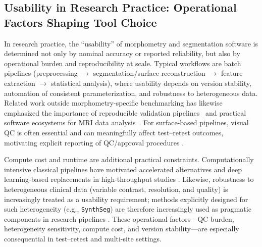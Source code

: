 \documentclass{midl} %
\begin{document}
\subsection{Usability in Research Practice: Operational Factors Shaping Tool Choice}
In research practice, the ``usability'' of morphometry and segmentation software is determined not only by nominal accuracy or reported reliability, but also by operational burden and reproducibility at scale. Typical workflows are batch pipelines (preprocessing $\rightarrow$ segmentation/surface reconstruction $\rightarrow$ feature extraction $\rightarrow$ statistical analysis), where usability depends on version stability, automation of consistent parameterization, and robustness to heterogeneous data. Related work outside morphometry-specific benchmarking has likewise emphasized the importance of reproducible validation pipelines~\citep{Kondrateva2020MRRepro} and practical software ecosystems for MRI data analysis~\citep{Bernstein2018MRISoftware}. For surface-based pipelines, visual QC is often essential and can meaningfully affect test--retest outcomes, motivating explicit reporting of QC/approval procedures \citep{Iscan2015}.

Compute cost and runtime are additional practical constraints. Computationally intensive classical pipelines have motivated accelerated alternatives and deep learning-based replacements in high-throughput studies \citep{Henschel2020}. Likewise, robustness to heterogeneous clinical data (variable contrast, resolution, and quality) is increasingly treated as a usability requirement; methods explicitly designed for such heterogeneity (e.g., \texttt{SynthSeg}) are therefore increasingly used as pragmatic components in research pipelines \citep{Billot2023,Billot2023PNAS}. These operational factors---QC burden, heterogeneity sensitivity, compute cost, and version stability---are especially consequential in test--retest and multi-site settings.
\end{document}
